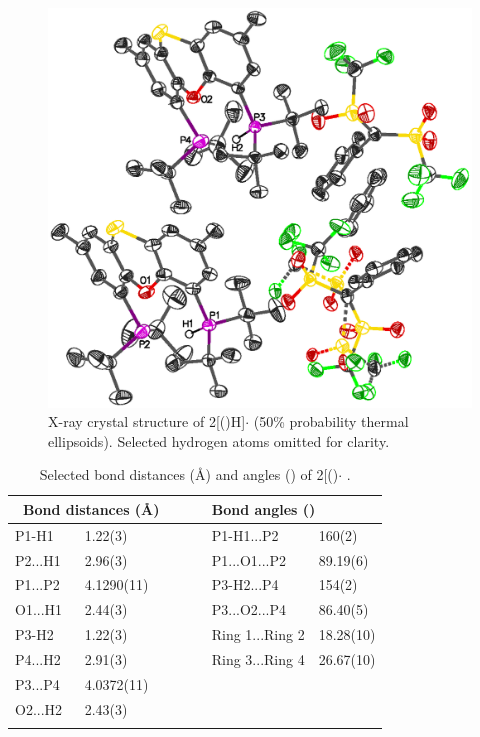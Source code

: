 \begin{figure}[hp!]
\begin{center}
\includegraphics{../Crystalstructures/mrmnb.eps}
\caption[X-ray crystal structure of {[}(\tButhixantphos)H{]}]{X-ray crystal structure of 2{[}(\tButhixantphos)H{]}$\cdot{}$  (50\% probability thermal ellipsoids).  Selected hydrogen atoms omitted for clarity.}
\label{Crystalprotonated}
\end{center}
\end{figure}

\begin{table}[htp]
\small
\caption[Selected bond distances (\AA) and angles (\degrees) of $\cdot{}$ ]{Selected bond distances (\AA) and angles (\degrees) of 2[(\tButhixantphos)\-\ce{H]CPh(SO2CF3)2}$\cdot{}$ .}
\vspace{1em}
\label{table:crystalprotonated:lengths}
\begin{center}
\begin{tabular}{l l l l l}
	\toprule
	\multicolumn{2}{l}{\bfseries{~Bond distances (\si{\angstrom})}} &~~~& \multicolumn{2}{l}{\bfseries{Bond angles (\degrees)}} \\
	\midrule		
	P1-H1	& 1.22(3)		&~~~& P1-H1...P2	& 160(2)\\
	P2...H1	& 2.96(3)		&~~~& P1...O1...P2	& 89.19(6)\\
	P1...P2	& 4.1290(11)	&~~~& P3-H2...P4	& 154(2)\\
	O1...H1	& 2.44(3)		&~~~& P3...O2...P4	& 86.40(5)\\
	P3-H2	& 1.22(3)		&~~~& Ring 1...Ring 2 & 18.28(10)\\
	P4...H2	& 2.91(3)		&~~~& Ring 3...Ring 4 & 26.67(10)\\
	P3...P4	& 4.0372(11)	&~~~& ~			& ~\\
	O2...H2	& 2.43(3)		&~~~& ~			& ~\\
	\bottomrule{}
\end{tabular}
\end{center}
\end{table}


